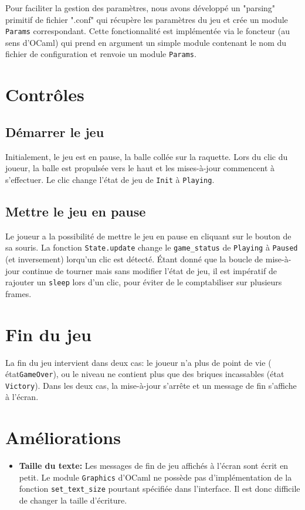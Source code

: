\documentclass[french]{template}
\begin{document}
Pour faciliter la gestion des paramètres, nous avons développé un "parsing" primitif de fichier ".conf" qui récupère les paramètres du jeu et crée un module \texttt{Params} correspondant. Cette fonctionnalité est implémentée via le foncteur (au sens d'OCaml)  qui prend en argument un simple module contenant le nom du fichier de configuration et renvoie un module \texttt{Params}.

\section{Contrôles}

\subsection{Démarrer le jeu}

Initialement, le jeu est en pause, la balle collée sur la raquette. Lors du clic du joueur, la balle est propulsée vers le haut et les mises-à-jour commencent à s'effectuer. Le clic change l'état de jeu de \texttt{Init} à \texttt{Playing}.

\subsection{Mettre le jeu en pause}

Le joueur a la possibilité de mettre le jeu en pause en cliquant sur le bouton de sa souris. La fonction \texttt{State.update} change le \texttt{game\_status} de \texttt{Playing} à \texttt{Paused} (et inversement) lorqu'un clic est détecté. Étant donné que la boucle de mise-à-jour continue de tourner mais sans modifier l'état de jeu, il est impératif de rajouter un \texttt{sleep} lors d'un clic, pour éviter de le comptabiliser sur plusieurs frames.

\section{Fin du jeu}

La fin du jeu intervient dans deux cas: le joueur n'a plus de point de vie ( état\texttt{GameOver}), ou le niveau ne contient plus que des briques incassables (état \texttt{Victory}). Dans les deux cas, la mise-à-jour s'arrête et un message de fin s'affiche à l'écran.

\section{Améliorations}

\begin{itemize}
    \item \textbf{Taille du texte:} Les messages de fin de jeu affichés à l'écran sont écrit en petit. Le module \texttt{Graphics} d'OCaml ne possède pas d'implémentation de la fonction \texttt{set\_text\_size} pourtant spécifiée dans l'interface. Il est donc difficile de changer la taille d'écriture.
\end{itemize}
\end{document}
